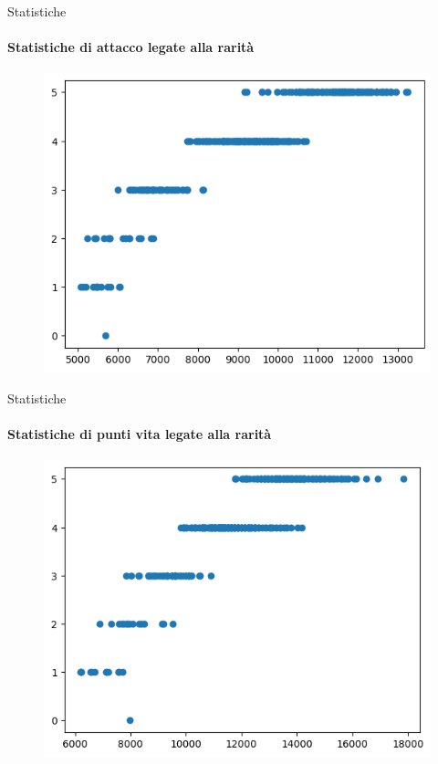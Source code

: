 \documentclass{beamer}
\begin{document}
\begin{darkframes}
  \begin{frame}{Statistiche}
    \framesubtitle{Statistiche di attacco legate alla rarità}
    \begin{figure}
      \centering
      \includegraphics[scale=0.675]{./images/class_and_stats_atk.png}
    \end{figure}
  \end{frame}

  \begin{frame}{Statistiche}
    \framesubtitle{Statistiche di punti vita legate alla rarità}
    \begin{figure}
      \centering
      \includegraphics[scale=0.675]{./images/class_and_stats_hp.png}
    \end{figure}
  \end{frame}


\end{darkframes}
\end{document}
